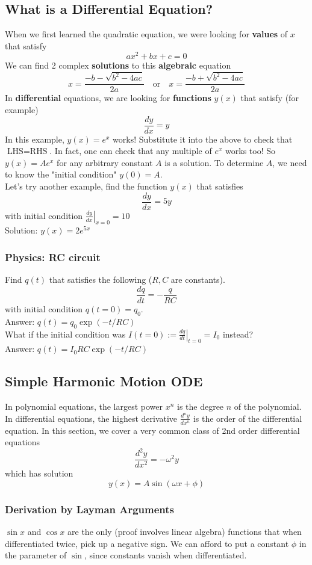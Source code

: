 \documentclass{article}
\begin{document}
\subsection{What is a Differential Equation?}
When we first learned the quadratic equation, we were looking for \textbf{values} of $x$ that satisfy $$ax^2 + bx + c = 0$$  We can find 2 complex \textbf{solutions} to this \textbf{algebraic} equation
$$x = \frac{-b - \sqrt{b^2 - 4ac}}{2a} \quad \text{or}\quad x = \frac{-b + \sqrt{b^2 - 4ac}}{2a}$$
In \textbf{differential} equations, we are looking for \textbf{functions} $y(x)$ that satisfy (for example)
$$\frac{dy}{dx} = y$$
In this example, $y(x) = e^x$ works! Substitute it into the above to check that $\text{LHS} = \text{RHS}$. In fact, one can check that any multiple of $e^x$ works too! So $y(x) = A e^x$ for any arbitrary constant $A$ is a solution. To determine $A$, we need to know the "initial condition" $y(0) = A$.
\\[10pt]
Let's try another example, find the function $y(x)$ that satisfies 
$$\frac{dy}{dx} = 5y$$ with initial condition $\left. \frac{dy}{dx} \right|_{x=0} = 10$\\
Solution: $y(x) = 2e^{5x}$
\subsubsection{Physics: RC circuit} 
Find $q(t)$ that satisfies the following ($R,C$ are constants).
$$\frac{dq}{dt} = -\frac{q}{RC}$$ with initial condition $q(t=0) = q_0$. \\Answer: $q(t) = q_0 \exp (-t/RC)$ \\[10pt]
What if the initial condition was $I(t=0) := \left. \frac{dq}{dt} \right|_{t=0} = I_0$ instead? \\ Answer: $q(t) = {I_0 RC} \exp (-t/RC)$\\[10pt]

\subsection{Simple Harmonic Motion ODE}
In polynomial equations, the largest power $x^n$ is the degree $n$ of the polynomial. In differential equations, the highest derivative $\frac{d^n y}{dx^n}$ is the order of the differential equation. In this section, we cover a very common class of 2nd order differential equations
$$\frac{d^2 y}{dx^2} = -\omega^2 y$$
which has solution
$$y(x) = A\sin(\omega x + \phi)$$
\subsubsection{Derivation by Layman Arguments}
$\sin x$ and $\cos x$ are the only (proof involves linear algebra) functions that when differentiated twice, pick up a negative sign. We can afford to put a constant $\phi$ in the parameter of $\sin$, since constants vanish when differentiated. 
\end{document}
